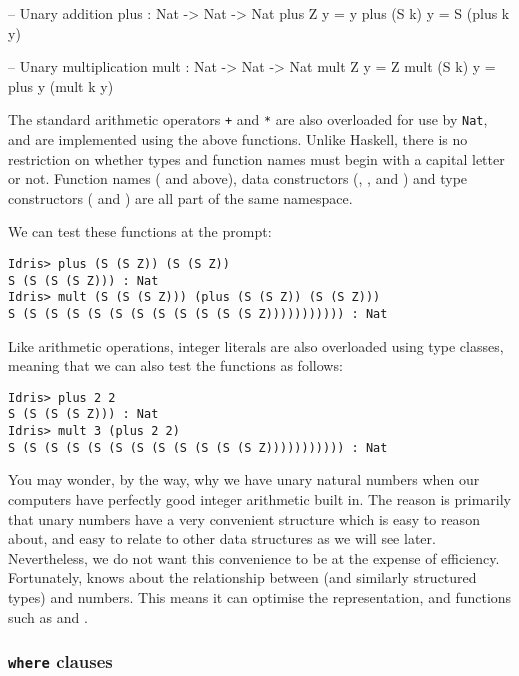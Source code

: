 \begin{code}
-- Unary addition
plus : Nat -> Nat -> Nat
plus Z     y = y
plus (S k) y = S (plus k y)

-- Unary multiplication
mult : Nat -> Nat -> Nat
mult Z     y = Z
mult (S k) y = plus y (mult k y)
\end{code}

\noindent
The standard arithmetic operators \texttt{+} and \texttt{*} are also overloaded for use by \texttt{Nat}, and are implemented using the above functions.
Unlike Haskell, there is no restriction on whether types and function names must begin with a capital letter or not.
Function names ( and  above), data constructors (, ,  and \tDC{::}) and type constructors ( and ) are all part of the same namespace.

We can test these functions at the \Idris{} prompt:

\begin{lstlisting}[style=stdout]
Idris> plus (S (S Z)) (S (S Z))
S (S (S (S Z))) : Nat
Idris> mult (S (S (S Z))) (plus (S (S Z)) (S (S Z)))
S (S (S (S (S (S (S (S (S (S (S (S Z))))))))))) : Nat
\end{lstlisting}

\noindent
Like arithmetic operations, integer literals are also overloaded using type classes, meaning that we can also test the functions as follows:

\begin{lstlisting}[style=stdout]
Idris> plus 2 2 
S (S (S (S Z))) : Nat
Idris> mult 3 (plus 2 2)
S (S (S (S (S (S (S (S (S (S (S (S Z))))))))))) : Nat
\end{lstlisting}

\noindent
You may wonder, by the way, why we have unary natural numbers when our computers have perfectly good integer arithmetic built in.
The reason is primarily that unary numbers have a very convenient structure which is easy to reason about, and easy to relate to other data structures as we will see later.
Nevertheless, we do not want this convenience to be at the expense of efficiency.
Fortunately, \Idris{} knows about the relationship between  (and similarly structured types) and numbers. This means it can optimise the representation, and functions such as  and .

\subsubsection*{\texttt{where} clauses}

